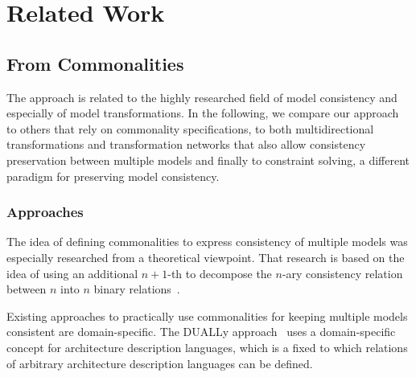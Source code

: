 \chapter{Related Work
}
\label{chap:relatedwork}

\section{From Commonalities}

The \commonalities approach is related to the highly researched field of model consistency and especially of model 
transformations.
In the following, we compare our approach to others that rely on commonality specifications, to both multidirectional transformations and transformation networks that also allow consistency preservation between multiple models and finally to constraint solving, a different paradigm for preserving model consistency.

\subsection*{\commonality Approaches}

The idea of defining commonalities to express consistency of multiple models was especially researched from a theoretical viewpoint.
That research is based on the idea of using an additional $n+1$-th \metamodel to decompose the $n$-ary consistency relation between $n$ \metamodels into $n$ binary relations~\cite{stunkel2018a, diskin2018a}.

Existing approaches to practically use commonalities for keeping multiple models consistent are domain-specific. 
The DUALLy approach~\cite{malavolta2010a, eramo2012a} uses a domain-specific concept \metamodel for architecture description languages, which is a fixed \metamodel to which relations of arbitrary architecture description languages can be defined.


